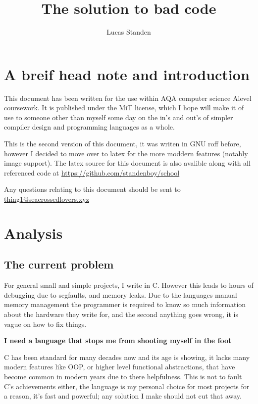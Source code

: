 \documentclass[a4paper,12pt]{article}
\author{Lucas Standen}
\title{The solution to bad code}
\begin{document}
\maketitle
\newpage
\tableofcontents
\newpage

\setlength{\parskip}{1em}
{\setlength{\parindent}{0cm}

\section{A breif head note and introduction}
This document has been written for the use within AQA computer science 
Alevel coursework. It is published under the MiT license, which I hope
will make it of use to someone other than myself some day on the in's
and out's of simpler compiler design and programming languages as a
whole.

This is the second version of this document, it was writen in GNU
roff before, however I decided to move over to latex for the
more moddern features (notably image support). The latex source for
this document is also avalible along with all referenced code at 
\url{https://github.com/standenboy/school}

Any questions relating to this document should be sent to 
\href{mailto:thing1@seacrossedlovers.xyz}{thing1@seacrossedlovers.xyz}

\section{Analysis}
\subsection{The current problem}
For general small and simple projects, I write in C. However this leads to
hours of debugging due to segfaults, and memory leaks. Due to the languages 
manual memory management the programmer is required to know so much 
information about the hardware they write for, and the second anything goes
wrong, it is vague on how to fix things.

\textbf{I need a language that stops me from shooting myself in the foot}

C has been standard for many decades now and its age is showing, it lacks
many modern features like OOP, or higher level functional abstractions, 
that have become common in modern years due to there helpfulness. This is 
not to fault C's achievements either, the language is my personal choice for
most projects for a reason, it's fast and powerful; any solution I make
should not cut that away.

}
\end{document}
